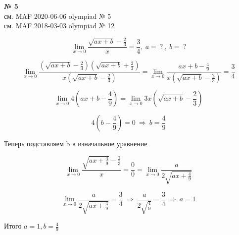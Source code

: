 \documentclass{article}
\begin{document}
\textbf{№ 5} 
\large
\\
см. MAF 2020-06-06 olympiad № 5 \\
см. MAF 2018-03-03 olympiad № 12

$$ \lim\limits_{x \to 0} \frac{\sqrt{ax + b} - \frac{2}{3}}{x}
= \frac{3}{4}, \ a = \ ? \ , \ b = \ ? $$  

$$ \lim\limits_{x \to 0} 
\frac{\left(\sqrt{ax + b} - \frac{2}{3}\right) \left(\sqrt{ax+b} + \frac{2}{3}\right)}
{x \left( \sqrt{ax+b} - \frac{2}{3}\right)} 
= \lim\limits_{x \to 0} \frac{ax + b - \frac{4}{9}}{x \left( \sqrt{ax+b} - \frac{2}{3}\right)} 
= \frac{3}{4} $$

$$ \lim\limits_{x \to 0} 4 \left( ax + b - \frac{4}{9} \right)
= \lim\limits_{x \to 0} 3x \left( \sqrt{ax+b} - \frac{2}{3}\right) $$

$$ 4 \left( b - \frac{4}{9} \right) 
= 0 
\
\Rightarrow 
\
b = \frac{4}{9} $$

Теперь подставляем b в изначальное уравнение

$$ \lim\limits_{x \to 0} \frac{\sqrt{ax + \frac{4}{9}} - \frac{2}{3}}{x}
= \frac{0}{0}
= \lim\limits_{x \to 0} \frac{a}{2\sqrt{ax+\frac{4}{9}}} $$

$$ \lim\limits_{x \to 0} \frac{a}{2\sqrt{ax+\frac{4}{9}}} 
= \frac{3}{4}
\
\Rightarrow 
\
\frac{a}{2\sqrt{\frac{4}{9}}}
= \frac{3}{4} 
\
\Rightarrow 
\
a = 1
$$

Итого $ a = 1, b = \frac{4}{9} $
\end{document}
